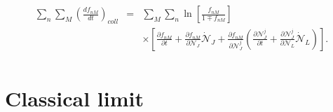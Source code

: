 \documentclass{article}
\begin{document}
\begin{eqnarray}
    \sum_n \sum_M\left( \frac{df_{nM}}{dt} \right)_{coll}&=&\sum_M \sum_n \ln \left[ \frac{f_{nM}}{1\mp f_{nM}} \right] \nonumber \\
    &&\times \left[ \frac{\partial f_{nM}}{\partial t}+\frac{\partial f_{nM}}{\partial \mathcal{N}_J}\dot{\mathcal{N}}_J+\frac{\partial f_{nM}}{\partial \mathcal{N}_J^{j}}\left( \frac{\partial \mathcal{N}_J^{j}}{\partial t}+\frac{\partial \mathcal{N}_J^{j}}{\partial \mathcal{N}_L}\dot{\mathcal{N}}_L \right) \right].  \nonumber \\ \label{transportequation2}
\end{eqnarray}


\section{Classical limit}
\end{document}
